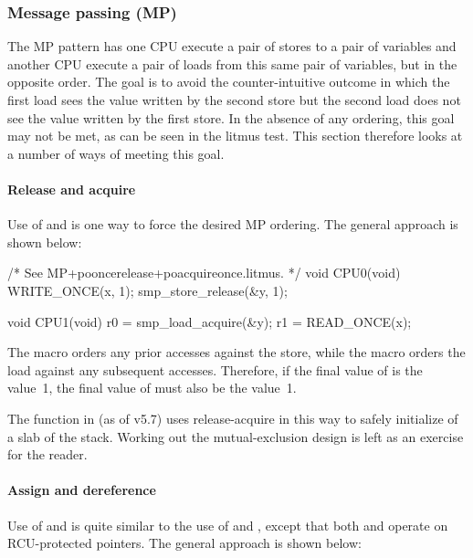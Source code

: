 \subsubsection{Message passing (MP)}

The MP pattern has one CPU execute a pair of stores to a pair of variables
and another CPU execute a pair of loads from this same pair of variables,
but in the opposite order.
The goal is to avoid the counter-intuitive outcome in which the first load
sees the value written by the second store but the second load does not see
the value written by the first store.
In the absence of any ordering, this goal may not be met, as can be seen
in the  litmus test.
This section therefore looks at a number of ways of meeting this goal.


\paragraph{Release and acquire}

Use of  and  is one way to force
the desired MP ordering.  The general approach is shown below:

\begin{VerbatimU}
	/* See MP+pooncerelease+poacquireonce.litmus. */
	void CPU0(void)
	{
		WRITE_ONCE(x, 1);
		smp_store_release(&y, 1);
	}

	void CPU1(void)
	{
		r0 = smp_load_acquire(&y);
		r1 = READ_ONCE(x);
	}
\end{VerbatimU}

The  macro orders any prior accesses against the
store, while the  macro orders the load against any
subsequent accesses.
Therefore, if the final value of  is the value~1, the final value
of  must also be the value~1.

The  function in  (as of v5.7)
uses release-acquire in this way to safely initialize of a slab of the stack.
Working out the mutual-exclusion design is left as an exercise for the reader.


\paragraph{Assign and dereference}

Use of  and  is quite similar
to the use of  and , except
that both  and  operate on
RCU-protected pointers.
The general approach is shown below:

